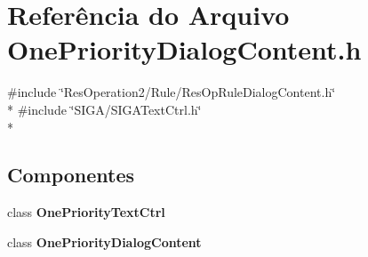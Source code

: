\section{Referência do Arquivo One\+Priority\+Dialog\+Content.\+h}
\label{_one_priority_dialog_content_8h}
{\ttfamily \#include \char`\"{}Res\+Operation2/\+Rule/\+Res\+Op\+Rule\+Dialog\+Content.\+h\char`\"{}}\\*
{\ttfamily \#include \char`\"{}S\+I\+G\+A/\+S\+I\+G\+A\+Text\+Ctrl.\+h\char`\"{}}\\*
\subsection*{Componentes}
\begin{DoxyCompactItemize}
\item 
class {\bf One\+Priority\+Text\+Ctrl}
\item 
class {\bf One\+Priority\+Dialog\+Content}
\end{DoxyCompactItemize}

